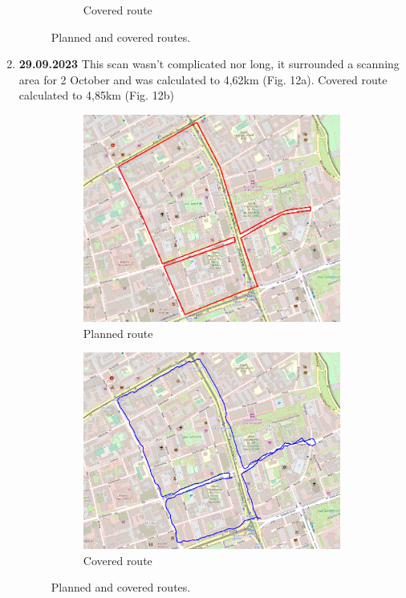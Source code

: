 \documentclass[a4paper,12pt]{article}
\begin{document}
\begin{enumerate}
\begin{figure}[H]
\begin{subfigure}{.90\textwidth}
			\caption{Covered route}
			\label{fig:b10}
		\end{subfigure}
		\caption{Planned and covered routes.}
		\label{fig:fig10}
	\end{figure} 
	\item \textbf{29.09.2023} This scan wasn't complicated nor long, it surrounded a scanning area for 2 October and was calculated to 4,62km (Fig. 12a). Covered route calculated to 4,85km (Fig. 12b)
	\begin{figure}[H]
		\centering
		\begin{subfigure}{.88\textwidth}
			\centering
			\includegraphics[width=1\linewidth]{route_p11}
			\caption{Planned route}
			\label{fig:a11}
		\end{subfigure}%
		\linebreak
		\begin{subfigure}{.88\textwidth}
			\centering
			\includegraphics[width=1\linewidth]{route_c11}
			\caption{Covered route}
			\label{fig:b11}
		\end{subfigure}
		\caption{Planned and covered routes.}
		\label{fig:fig11}
	\end{figure} 
\end{enumerate}
\end{document}
